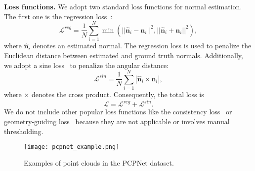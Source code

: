 \documentclass[sigconf]{acmart}
\begin{document}
\textbf{Loss functions.}
We adopt two standard loss functions for normal estimation. The first one is the regression loss~\cite{guerrero2018pcpnet,zhang2022geometry}: 
\begin{equation}\label{eq: regression loss}
    \mathcal{L}^{reg} = \frac{1}{N}\sum_{i=1}^N \min(||\widehat{\textbf{n}}_i - \textbf{n}_i||^2, ||\widehat{\textbf{n}}_i + \textbf{n}_i||^2),
\end{equation}
where $\widehat{\textbf{n}}_i$ denotes an estimated normal. The regression loss is used to penalize the Euclidean distance between estimated and ground truth normals. Additionally, we adopt a sine loss~\cite{ben2020deepfit,li2022hsurf} to penalize the angular distance:
\begin{equation}\label{eq: sin loss}
    \mathcal{L}^{sin} = \frac{1}{N}\sum_{i=1}^N|\widehat{\textbf{n}}_i \times \textbf{n}_i|,
\end{equation}
where $\times$ denotes the cross product. Consequently, the total loss is
\begin{equation}\label{eq: total loss}
    \mathcal{L} = \mathcal{L}^{reg} + \mathcal{L}^{sin}. 
\end{equation}
We do not include other popular loss functions like the consistency loss~\cite{ben2020deepfit,zhu2021adafit,li2022graphfit} or geometry-guiding loss~\cite{zhang2022geometry,li2022hsurf} because they are not applicable or involves manual thresholding.  














































\begin{figure}[t]
    \centering
    \texttt{[image: pcpnet\_example.png]}
    \caption{Examples of point clouds in the PCPNet dataset. 
}
    \label{fig: pcpnnet example}
\end{figure}
\end{document}
